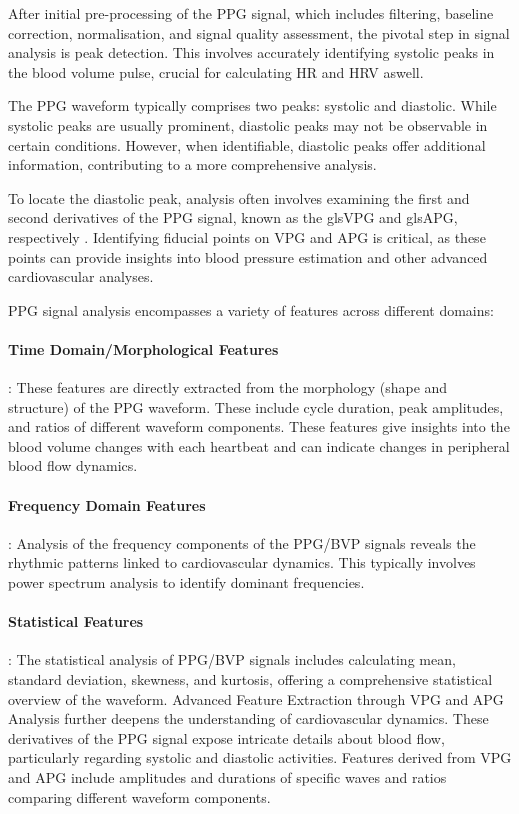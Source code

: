 After initial pre-processing of the PPG signal, which includes filtering, baseline correction, normalisation, and signal quality assessment, the pivotal step in signal analysis is peak detection. This involves accurately identifying systolic peaks in the blood volume pulse, crucial for calculating HR and HRV aswell.

The PPG waveform typically comprises two peaks: systolic and diastolic. While systolic peaks are usually prominent, diastolic peaks may not be observable in certain conditions. However, when identifiable, diastolic peaks offer additional information, contributing to a more comprehensive analysis.

To locate the diastolic peak, analysis often involves examining the first and second derivatives of the PPG signal, known as the  gls{VPG} and  gls{APG}, respectively \parencite{apg}. Identifying fiducial points on VPG and APG is critical, as these points can provide insights into blood pressure estimation and other advanced cardiovascular analyses.

PPG signal analysis encompasses a variety of features across different domains:

\paragraph*{Time Domain/Morphological Features}: These features are directly extracted from the morphology (shape and structure) of the PPG waveform.
These include cycle duration, peak amplitudes, and ratios of different waveform components. These features give insights into the blood volume changes with each heartbeat and can indicate changes in peripheral blood flow dynamics.
\paragraph*{Frequency Domain Features}: Analysis of the frequency components of the PPG/BVP signals reveals the rhythmic patterns linked to cardiovascular dynamics. This typically involves power spectrum analysis to identify dominant frequencies.
\paragraph*{Statistical Features}: The statistical analysis of PPG/BVP signals includes calculating mean, standard deviation, skewness, and kurtosis, offering a comprehensive statistical overview of the waveform.
Advanced Feature Extraction through VPG and APG Analysis further deepens the understanding of cardiovascular dynamics. These derivatives of the PPG signal expose intricate details about blood flow, particularly regarding systolic and diastolic activities. Features derived from VPG and APG include amplitudes and durations of specific waves and ratios comparing different waveform components.

